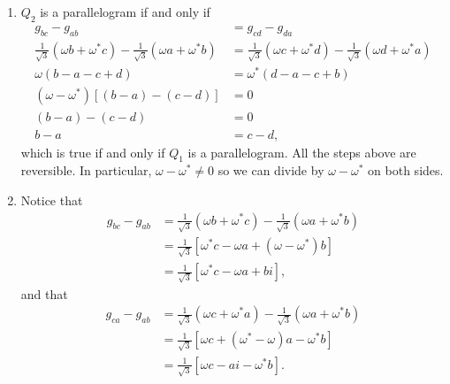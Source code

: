 \begin{enumerate}
    \item \(Q_2\) is a parallelogram if and only if
          \begin{align*}
              g_{bc} - g_{ab}                                                                                               & = g_{cd} - g_{da}                                                                                               \\
              \frac{1}{\sqrt{3}} \left(\omega b + \omega^* c\right) - \frac{1}{\sqrt{3}} \left(\omega a + \omega^* b\right) & = \frac{1}{\sqrt{3}} \left(\omega c + \omega^* d\right) - \frac{1}{\sqrt{3}} \left(\omega d + \omega^* a\right) \\
              \omega(b - a - c + d)                                                                                         & = \omega^* (d - a - c + b)                                                                                      \\
              \left(\omega - \omega^*\right) \left[(b - a) - (c - d)\right]                                                 & = 0                                                                                                             \\
              (b - a) - (c - d)                                                                                             & = 0                                                                                                             \\
              b - a                                                                                                         & = c - d,
          \end{align*}
          which is true if and only if \(Q_1\) is a parallelogram. All the steps above are reversible. In particular, \(\omega - \omega^* \neq 0\) so we can divide by \(\omega - \omega^*\) on both sides.

    \item Notice that
          \begin{align*}
              g_{bc} - g_{ab} & = \frac{1}{\sqrt{3}} \left(\omega b + \omega^* c\right) - \frac{1}{\sqrt{3}} \left(\omega a + \omega^* b\right) \\
                              & = \frac{1}{\sqrt{3}} \left[\omega^* c - \omega a + (\omega - \omega^*) b\right]                                 \\
                              & = \frac{1}{\sqrt{3}} \left[\omega^* c - \omega a + bi\right],
          \end{align*}
          and that
          \begin{align*}
              g_{ca} - g_{ab} & = \frac{1}{\sqrt{3}} \left(\omega c + \omega^* a\right) - \frac{1}{\sqrt{3}} \left(\omega a + \omega^* b\right) \\
                              & = \frac{1}{\sqrt{3}} \left[\omega c + (\omega^* - \omega)a - \omega^* b\right]                                  \\
                              & = \frac{1}{\sqrt{3}} \left[\omega c - ai - \omega^* b\right].
          \end{align*}


\end{enumerate}
